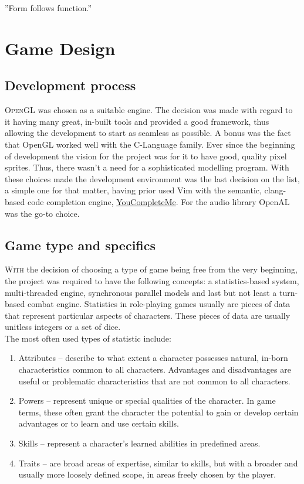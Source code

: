 \begin{savequote}[75mm] 
”Form follows function.”
\end{savequote}

\chapter{Game Design}
\section{Development process}
\lettrine[lines=1]{\color{Crimson}O}{penGL} was chosen as a suitable engine. The decision was made with regard to it having many great, in-built tools and provided a good framework, thus allowing the development to start as seamless as possible. A bonus was the fact that OpenGL\cite{Shreiner2013} worked well with the C-Language family\cite{Ritchie1988}. Ever since the beginning of development the vision for the project was for it to have good, quality pixel sprites. Thus, there wasn't a need for a sophisticated modelling program.
With these choices made the development environment was the last decision on the list, a simple one for that matter, having prior used Vim with the semantic, clang-based code completion engine, \href{http://valloric.github.io/YouCompleteMe}{YouCompleteMe}. For the audio library OpenAL was the go-to choice.\\
\newpage
\section{Game type and specifics}
\lettrine[lines=1]{\color{Crimson}W}{ith} the decision of choosing a type of game being free from the very beginning, the project was required to have the following concepts: a statistics-based system, multi-threaded engine\cite{Gamasutra, Bitsquid}, synchronous parallel models and last but not least a turn-based combat engine. Statistics in role-playing games usually are pieces of data that represent particular aspects of characters. These pieces of data are usually unitless integers or a set of dice.\\
The most often used types of statistic include:
\begin{enumerate}
\item Attributes
\noindent -- describe to what extent a character possesses natural, in-born characteristics common to all characters.
Advantages and disadvantages are useful or problematic characteristics that are not common to all characters.
\item Powers
\noindent -- represent unique or special qualities of the character. In game terms, these often grant the character the potential to gain or develop certain advantages or to learn and use certain skills.
\item Skills
\noindent -- represent a character's learned abilities in predefined areas.
\item Traits
\noindent -- are broad areas of expertise, similar to skills, but with a broader and usually more loosely defined scope, in areas freely chosen by the player.
\end{enumerate}

\afterpage{\clearpage}